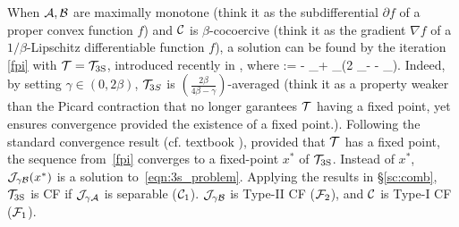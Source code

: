 When ${\mathcal{A}}, {\mathcal{B}}$ are maximally monotone (think it as the subdifferential $\partial f$ of a proper convex function $f$) and ${\mathcal{C}}$ is $\beta$-cocoercive (think it as the gradient $\nabla f$ of a $1/\beta$-Lipschitz differentiable function $f$),  a solution can be found by the iteration \eqref{fpi} with ${\mathcal{T}}={{\mathcal{T}}_{\mathrm{3S}}}$, introduced recently in \cite{davis2015three}, where  
\beq\label{3s}
\TS := \cI- \cJ_{\gamma \cB}+ \cJ_{\gamma \cA}\circ(2 \cJ_{\gamma \cB}- \cI - \gamma \cC\circ \cJ_{\gamma \cB}).
\eeq {}Indeed, by setting  $\gamma\in(0,2\beta)$, ${\mathcal{T}}_{3S}$ is $(\frac{2\beta}{4\beta-\gamma})$-averaged (think it as a property weaker than the Picard contraction that no longer garantees ${\mathcal{T}}$ having a fixed point, yet ensures convergence provided the existence of a fixed point.). Following the standard convergence result (cf. textbook \cite{B-C2011cvx-mon}), provided that ${\mathcal{T}}$ has a  fixed point, the sequence from~\eqref{fpi} converges to a fixed-point $x^*$ of ${{\mathcal{T}}_{\mathrm{3S}}}$. Instead of $x^*$, ${\mathcal{J}}_{\gamma{\mathcal{B}}}(x^*)$ is a solution to~\eqref{eqn:3s_problem}.  
Applying the results in \S\ref{sc:comb},  ${{\mathcal{T}}_{\mathrm{3S}}}$ {is CF if } ${\mathcal{J}}_{\gamma {\mathcal{A}}}$ is separable (${\mathcal{C}}_1$). ${\mathcal{J}}_{\gamma {\mathcal{B}}}$ is Type-II CF (${\mathcal{F}}_2$), and ${\mathcal{C}}$ is Type-I CF (${\mathcal{F}}_1$). %


